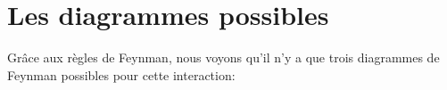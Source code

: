\documentclass[12pt, a4paper]{article}
\begin{document}
 	\section*{Les diagrammes possibles}
 	Grâce aux règles de Feynman, nous voyons qu'il n'y a que trois diagrammes de Feynman  possibles pour cette interaction:

\end{document}
